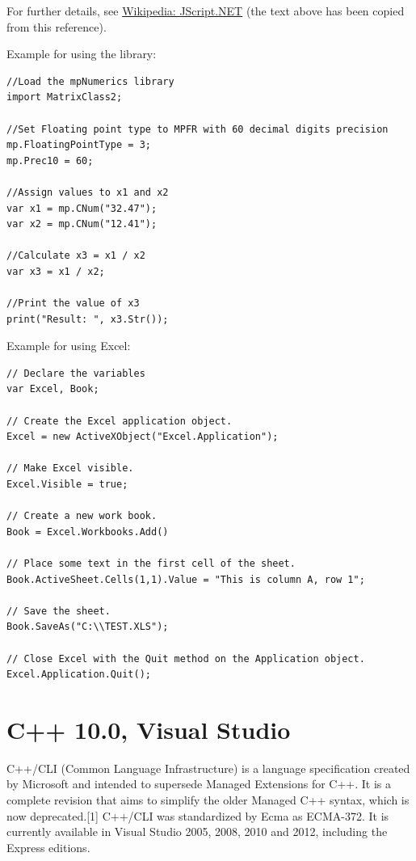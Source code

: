For further details, see \href{http://en.wikipedia.org/wiki/JScript_.NET}{Wikipedia: JScript.NET} (the text above has been copied from this reference).

\noindent Example for using the library:

\begin{lstlisting}
//Load the mpNumerics library
import MatrixClass2;

//Set Floating point type to MPFR with 60 decimal digits precision
mp.FloatingPointType = 3;
mp.Prec10 = 60;

//Assign values to x1 and x2
var x1 = mp.CNum("32.47");
var x2 = mp.CNum("12.41");

//Calculate x3 = x1 / x2
var x3 = x1 / x2;

//Print the value of x3
print("Result: ", x3.Str());
\end{lstlisting}



\noindent Example for using Excel:

\begin{lstlisting}
// Declare the variables
var Excel, Book;

// Create the Excel application object.
Excel = new ActiveXObject("Excel.Application");

// Make Excel visible.
Excel.Visible = true;

// Create a new work book.
Book = Excel.Workbooks.Add()

// Place some text in the first cell of the sheet.
Book.ActiveSheet.Cells(1,1).Value = "This is column A, row 1";

// Save the sheet.
Book.SaveAs("C:\\TEST.XLS");

// Close Excel with the Quit method on the Application object.
Excel.Application.Quit();
\end{lstlisting}







\newpage
\section{C++ 10.0, Visual Studio}
C++/CLI (Common Language Infrastructure) is a language specification created by Microsoft and intended to supersede Managed Extensions for C++. It is a complete revision that aims to simplify the older Managed C++ syntax, which is now deprecated.[1] C++/CLI was standardized by Ecma as ECMA-372. It is currently available in Visual Studio 2005, 2008, 2010 and 2012, including the Express editions.

